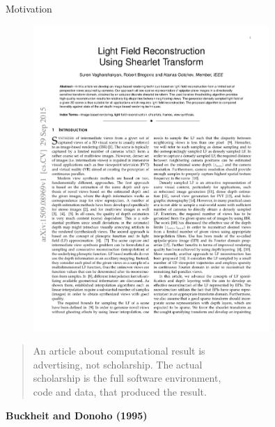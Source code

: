 \begin{frame}{Motivation}
\begin{figure}[h!]
\centering
\includegraphics[width=0.8\textwidth]{./images/LightField_Shearlet.pdf}
\end{figure}

\begin{quote}
An article about computational result is \\
advertising, not scholarship. The actual \\
scholarship is the full software environment,\\
code and data, that produced the result.
\end{quote}
\begin{flushright}
\textbf{Buckheit and Donoho (1995)}
\end{flushright}
\end{frame}

